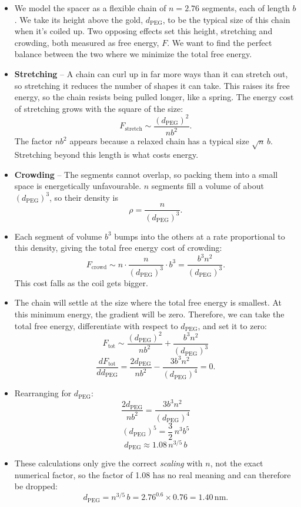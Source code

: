\documentclass[10pt,a4paper]{article}
\numberwithin{equation}{section}
\newcommand{\nm}{\,\mathrm{nm}}
\newcommand{\dpeg}{d_{\mathrm{PEG}}}
\newcommand{\dropdown}{\par\medskip}
\begin{document}
\dropdown
\begin{itemize}
  \item We model the spacer as a flexible chain of $n = 2.76$ segments, each of length $b$. We take its height above the gold, $\dpeg$, to be the typical size of this chain when it's coiled up. Two opposing effects set this height, stretching and crowding, both measured as free energy, $F$. We want to find the perfect balance between the two where we minimize the total free energy.
  \item \textbf{Stretching} -- A chain can curl up in far more ways than it can stretch out, so stretching it reduces the number of shapes it can take. This raises its free energy, so the chain resists being pulled longer, like a spring. The energy cost of stretching grows with the square of the size:
  \[ F_{\mathrm{stretch}} \sim \frac{(\dpeg)^2}{nb^2}. \]
  The factor $nb^2$ appears because a relaxed chain has a typical size $\sqrt{n}\,b$. Stretching beyond this length is what costs energy.
  \item \textbf{Crowding} -- The segments cannot overlap, so packing them into a small space is energetically unfavourable. $n$ segments fill a volume of about $(\dpeg)^3$, so their density is
  \[ \rho = \frac{n}{(\dpeg)^3}. \]
  \item Each segment of volume $b^3$ bumps into the others at a rate proportional to this density, giving the total free energy cost of crowding:
  \[ F_{\mathrm{crowd}} \sim n\cdot\frac{n}{(\dpeg)^3}\cdot b^3 = \frac{b^3n^2}{(\dpeg)^3}. \]
  This cost falls as the coil gets bigger.
  \item The chain will settle at the size where the total free energy is smallest. At this minimum energy, the gradient will be zero. Therefore, we can take the total free energy, differentiate with respect to $\dpeg$, and set it to zero:
  \[ F_{\mathrm{tot}} \sim \frac{(\dpeg)^2}{nb^2} + \frac{b^3n^2}{(\dpeg)^3} \]
  \[ \frac{dF_{\mathrm{tot}}}{d\dpeg} = \frac{2\dpeg}{nb^2} - \frac{3b^3n^2}{(\dpeg)^4} = 0. \]
  \item Rearranging for $\dpeg$:
  \[ \frac{2\dpeg}{nb^2} = \frac{3b^3n^2}{(\dpeg)^4} \]
  \[ (\dpeg)^5 = \frac32\,n^3b^5 \]
  \[ \dpeg \approx 1.08\,n^{3/5}\,b \]
  \item These calculations only give the correct \emph{scaling} with $n$, not the exact numerical factor, so the factor of 1.08 has no real meaning and can therefore be dropped:
  \[ \dpeg = n^{3/5}\,b = 2.76^{0.6}\times0.76 = 1.40\nm. \]
\end{itemize}
\end{document}
